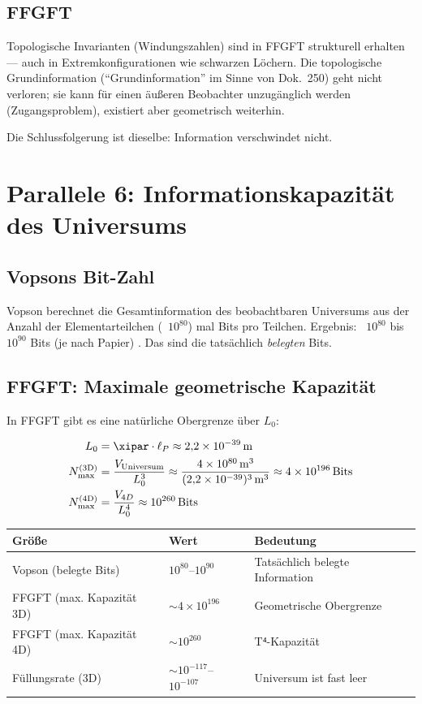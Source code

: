 \subsection{FFGFT}

Topologische Invarianten (Windungszahlen) sind in FFGFT strukturell erhalten
--- auch in Extremkonfigurationen wie schwarzen Löchern. Die topologische
Grundinformation (``Grundinformation'' im Sinne von Dok.~250) geht nicht
verloren; sie kann für einen äußeren Beobachter unzugänglich werden
(Zugangsproblem), existiert aber geometrisch weiterhin.

Die Schlussfolgerung ist dieselbe: Information verschwindet nicht.

\section{Parallele 6: Informationskapazität des Universums}

\subsection{Vopsons Bit-Zahl}

Vopson berechnet die Gesamtinformation des beobachtbaren Universums aus der
Anzahl der Elementarteilchen (~$10^{80}$) mal Bits pro Teilchen.
Ergebnis: ~$10^{80}$ bis $10^{90}$ Bits (je nach Papier) \cite{Vopson2023}.
Das sind die tatsächlich \emph{belegten} Bits.

\subsection{FFGFT: Maximale geometrische Kapazität}

In FFGFT gibt es eine natürliche Obergrenze über $L_0$:

\begin{align}
  L_0 &= \xipar \cdot \ell_P \approx 2{,}2 \times 10^{-39}\,\text{m} \\
  N_\text{max}^\text{(3D)} &= \frac{V_\text{Universum}}{L_0^3}
    \approx \frac{4 \times 10^{80}\,\text{m}^3}{(2{,}2 \times 10^{-39})^3\,\text{m}^3}
    \approx 4 \times 10^{196}\,\text{Bits} \\
  N_\text{max}^\text{(4D)} &= \frac{V_{4D}}{L_0^4}
    \approx 10^{260}\,\text{Bits}
\end{align}

\begin{longtable}{lll}
\toprule
Größe & Wert & Bedeutung \\
\midrule
Vopson (belegte Bits) & $10^{80}$--$10^{90}$ & Tatsächlich belegte Information \\
FFGFT (max. Kapazität 3D) & $\sim 4\times10^{196}$ & Geometrische Obergrenze \\
FFGFT (max. Kapazität 4D) & $\sim 10^{260}$ & T⁴-Kapazität \\
Füllungsrate (3D) & $\sim 10^{-117}$--$10^{-107}$ & Universum ist fast leer \\
\bottomrule
\end{longtable}

